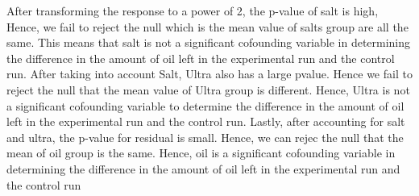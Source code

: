 \documentclass[]{article}
\begin{document}
After transforming the response to a power of 2, the p-value of salt is
high, Hence, we fail to reject the null which is the mean value of salts
group are all the same. This means that salt is not a significant
cofounding variable in determining the difference in the amount of oil
left in the experimental run and the control run. After taking into
account Salt, Ultra also has a large pvalue. Hence we fail to reject the
null that the mean value of Ultra group is different. Hence, Ultra is
not a significant cofounding variable to determine the difference in the
amount of oil left in the experimental run and the control run. Lastly,
after accounting for salt and ultra, the p-value for residual is small.
Hence, we can rejec the null that the mean of oil group is the same.
Hence, oil is a significant cofounding variable in determining the
difference in the amount of oil left in the experimental run and the
control run
\end{document}
